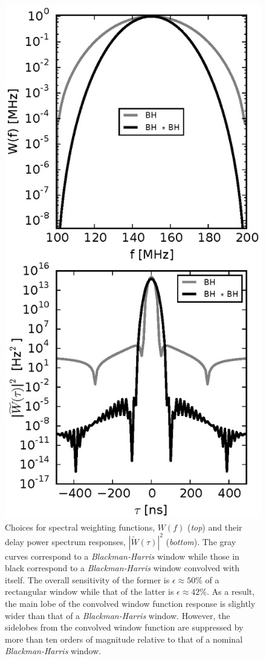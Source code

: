 \documentclass[preprint2,iop,numberedappendix,twocolappendix,appendixfloats]{emulateapj}
\begin{document}
\begin{figure}[htb]
  \centering
  \includegraphics[width=\linewidth]{f1.eps}
  \caption{Choices for spectral weighting functions, $W(f)$ ({\it top}) and their delay power spectrum responses, $|\widetilde{W}(\tau)|^2$ ({\it bottom}). The gray curves correspond to a {\it Blackman-Harris} window while those in black correspond to a {\it Blackman-Harris} window convolved with itself. The overall sensitivity of the former is $\epsilon \approx 50\%$ of a rectangular window while that of the latter is $\epsilon \approx 42\%$. As a result, the main lobe of the convolved window function response is slightly wider than that of a {\it Blackman-Harris} window. However, the sidelobes from the convolved window function are suppressed by more than ten orders of magnitude relative to that of a nominal {\it Blackman-Harris} window.}

\end{figure}
\end{document}
